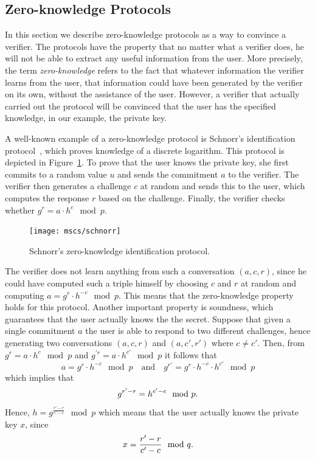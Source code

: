 \subsection{Zero-knowledge Protocols}

In this section we describe zero-knowledge protocols as a way to convince a
verifier. The protocols have the property that no matter what a verifier does,
he will not be able to extract any useful information from the user. More
precisely, the term \emph{zero-knowledge} refers to the fact that whatever
information the verifier learns from the user, that information could have been
generated by the verifier on its own, without the assistance of the user.
However, a verifier that actually carried out the protocol will be convinced
that the user has the specified knowledge, in our example, the private key.

A well-known example of a zero-knowledge protocol is Schnorr's identification
protocol~\cite{Schnorr1991}, which proves knowledge of a discrete logarithm.
This protocol is depicted in Figure~\ref{msc:schnorr}. To prove that the user
knows the private key, she first commits to a random value $u$ and sends the
commitment $a$ to the verifier. The verifier then generates a challenge $c$ at
random and sends this to the user, which computes the response $r$ based on the
challenge. Finally, the verifier checks whether $g^r = a \cdot h^c \mod p$.

\begin{figure}[ht]
  \centering
  \texttt{[image: mscs/schnorr]}
  \caption{Schnorr's zero-knowledge identification protocol.}
  \label{msc:schnorr}
\end{figure}


The verifier does not learn anything from such a conversation $(a, c, r)$, since
he could have computed such a triple himself by choosing $c$ and $r$ at random
and computing $a = g^r \cdot h^{-c} \mod p$. This means that the zero-knowledge
property holds for this protocol. Another important property is soundness, which
guarantees that the user actually knows the the secret. Suppose that given a
single commitment $a$ the user is able to respond to two different challenges,
hence generating two conversations $(a, c, r)$ and $(a, c', r')$ where
$c \neq c'$. Then, from $g^r = a \cdot h^c \mod p$ and
$g^{'r} = a \cdot h^{c'} \mod p$ it follows that
\begin{equation*}
  a = g^r \cdot h^{-c} \mod p
  \quad\text{and}\quad
  g^{r'} = g^r \cdot h^{-c} \cdot h^{c'} \mod p
\end{equation*}
which implies that
\begin{equation*}
  g^{r'-r} = h^{c'-c} \mod p\text.
\end{equation*}
Hence, $h = g^{\frac{r'-r}{c'-c}} \mod p$ which means that the user actually
knows the private key $x$, since
\begin{equation*}
  x = \frac{r'-r}{c'-c} \mod q\text.
\end{equation*}


